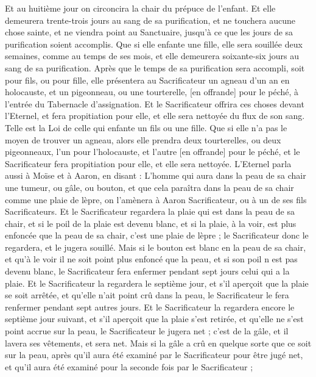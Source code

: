 \begin{multicols}{2}
Et au huitième jour on circoncira la chair du prépuce de l'enfant.
Et elle demeurera trente-trois jours au sang de sa purification, et ne touchera aucune chose sainte, et ne viendra point au Sanctuaire, jusqu'à ce que les jours de sa purification soient accomplis.
Que si elle enfante une fille, elle sera souillée deux semaines, comme au temps de ses mois, et elle demeurera soixante-six jours au sang de sa purification.
Après que le temps de sa purification sera accompli, soit pour fils, ou pour fille, elle présentera au Sacrificateur un agneau d'un an en holocauste, et un pigeonneau, ou une tourterelle, [en offrande] pour le péché, à l'entrée du Tabernacle d'assignation.
Et le Sacrificateur offrira ces choses devant l'Eternel, et fera propitiation pour elle, et elle sera nettoyée du flux de son sang. Telle est la Loi de celle qui enfante un fils ou une fille.
Que si elle n'a pas le moyen de trouver un agneau, alors elle prendra deux tourterelles, ou deux pigeonneaux, l'un pour l'holocauste, et l'autre [en offrande] pour le péché, et le Sacrificateur fera propitiation pour elle, et elle sera nettoyée.
\VerseOne{}L'Eternel parla aussi à Moïse et à Aaron, en disant :
L'homme qui aura dans la peau de sa chair une tumeur, ou gâle, ou bouton, et que cela paraîtra dans la peau de sa chair comme une plaie de lèpre, on l'amènera à Aaron Sacrificateur, ou à un de ses fils Sacrificateurs.
Et le Sacrificateur regardera la plaie qui est dans la peau de sa chair, et si le poil de la plaie est devenu blanc, et si la plaie, à la voir, est plus enfoncée que la peau de sa chair, c'est une plaie de lèpre ; le Sacrificateur donc le regardera, et le jugera souillé.
Mais si le bouton est blanc en la peau de sa chair, et qu'à le voir il ne soit point plus enfoncé que la peau, et si son poil n est pas devenu blanc, le Sacrificateur fera enfermer pendant sept jours celui qui a la plaie.
Et le Sacrificateur la regardera le septième jour, et s'il aperçoit que la plaie se soit arrêtée, et qu'elle n'ait point crû dans la peau, le Sacrificateur le fera renfermer pendant sept autres jours.
Et le Sacrificateur la regardera encore le septième jour suivant, et s'il aperçoit que la plaie s'est retirée, et qu'elle ne s'est point accrue sur la peau, le Sacrificateur le jugera net ; c'est de la gâle, et il lavera ses vêtements, et sera net.
Mais si la gâle a crû en quelque sorte que ce soit sur la peau, après qu'il aura été examiné par le Sacrificateur pour être jugé net, et qu'il aura été examiné pour la seconde fois par le Sacrificateur ;

\end{multicols}
